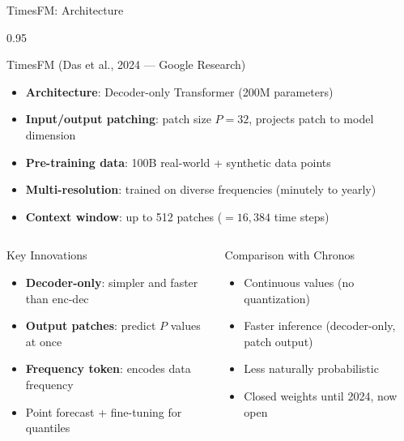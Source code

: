 \documentclass[9pt, aspectratio=169, t]{beamer}
\begin{document}
\begin{frame}{TimesFM: Architecture}
    \begin{cminipage}{0.95\textwidth}
    \vspace{-3mm}
    {\scriptsize
    \begin{block}{TimesFM (Das et al., 2024 --- Google Research)}
        \vspace{-1mm}
        \begin{itemize}\setlength{\itemsep}{0pt}
            \item \textbf{Architecture}: Decoder-only Transformer (200M parameters)
            \item \textbf{Input/output patching}: patch size $P = 32$, projects patch to model dimension
            \item \textbf{Pre-training data}: 100B real-world + synthetic data points
            \item \textbf{Multi-resolution}: trained on diverse frequencies (minutely to yearly)
            \item \textbf{Context window}: up to 512 patches ($= 16{,}384$ time steps)
        \end{itemize}
        \vspace{-1mm}
    \end{block}
    \vspace{-2.5mm}
    \begin{columns}[T]
        \begin{exampleblock}{Key Innovations}
            \begin{itemize}\setlength{\itemsep}{0pt}
                \item \textbf{Decoder-only}: simpler and faster than enc-dec
                \item \textbf{Output patches}: predict $P$ values at once
                \item \textbf{Frequency token}: encodes data frequency
                \item Point forecast + fine-tuning for quantiles
            \end{itemize}
        \end{exampleblock}

        \begin{alertblock}{Comparison with Chronos}
            \begin{itemize}\setlength{\itemsep}{0pt}
                \item Continuous values (no quantization)
                \item Faster inference (decoder-only, patch output)
                \item Less naturally probabilistic
                \item Closed weights until 2024, now open
            \end{itemize}
        \end{alertblock}
    \end{columns}
    }
    \end{cminipage}
\end{frame}
\end{document}
